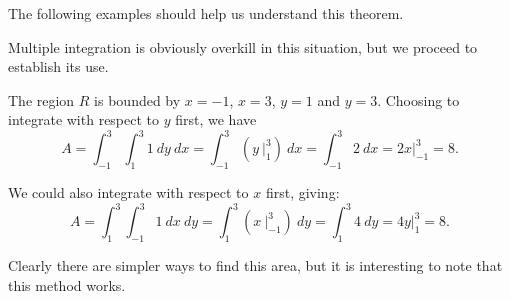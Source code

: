 The following examples should help us understand this theorem.\\

{Multiple integration is obviously overkill in this situation, but we proceed to establish its use.

The region $R$ is bounded by $x=-1$, $x=3$, $y=1$ and $y=3$. Choosing to integrate with respect to $y$ first, we have 
$$A = \int_{-1}^3\int_1^3 1\ dy\ dx = \int_{-1}^3 \left(y\ \Big|_1^3\right)\ dx = \int_{-1}^3 2\ dx = 2x\Big|_{-1}^3=8.$$

We could also integrate with respect to $x$ first, giving:
$$A = \int_1^3\int_{-1}^3 1\ dx \ dy =\int_1^3 \left(x\ \Big|_{-1}^3\right)\ dy = \int_1^3 4\ dy = 4y\Big|_1^3 = 8.$$

Clearly there are simpler ways to find this area, but it is interesting to note that this method works.
}\\


